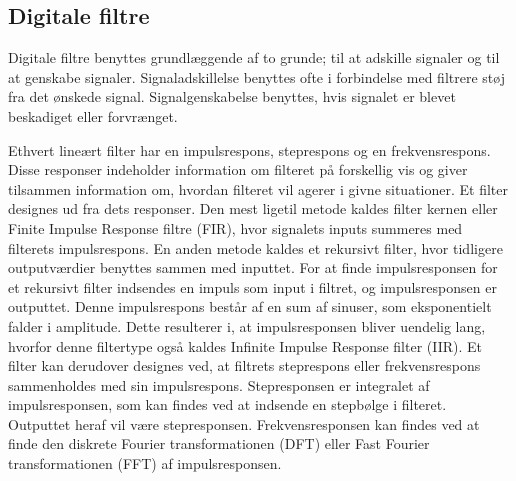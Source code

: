 \subsection{Digitale filtre}

Digitale filtre benyttes grundlæggende af to grunde; til at adskille signaler og til at genskabe signaler. 
Signaladskillelse %
benyttes ofte i forbindelse med filtrere støj fra det ønskede signal. 
Signalgenskabelse benyttes, hvis signalet er blevet beskadiget eller forvrænget.  \citep{Smith1997}

Ethvert lineært filter har en impulsrespons, steprespons og en frekvensrespons. Disse responser indeholder information om filteret på forskellig vis og giver tilsammen information om, hvordan filteret vil agerer i givne situationer. \citep{Smith1997} \newline
Et filter designes ud fra dets responser. Den mest ligetil metode kaldes filter kernen eller Finite Impulse Response filtre (FIR), hvor signalets inputs summeres med filterets impulsrespons. En anden metode kaldes et rekursivt filter, hvor tidligere outputværdier benyttes sammen med inputtet. For at finde impulsresponsen for et rekursivt filter indsendes en impuls som input i filtret, og impulsresponsen er outputtet. Denne impulsrespons består af en sum af sinuser, som eksponentielt falder i amplitude. Dette resulterer i, at impulsresponsen bliver uendelig lang, hvorfor denne filtertype også kaldes Infinite Impulse Response filter (IIR). \citep{Smith1997,Blandford2013} \newline
Et filter kan derudover designes ved, at filtrets steprespons eller frekvensrespons sammenholdes med sin impulsrespons. Stepresponsen er integralet af impulsresponsen, som kan findes ved at indsende en stepbølge i filteret. Outputtet heraf vil være stepresponsen. Frekvensresponsen kan findes ved at finde den diskrete Fourier transformationen (DFT) eller Fast Fourier transformationen (FFT) af impulsresponsen. \citep{Smith1997}



